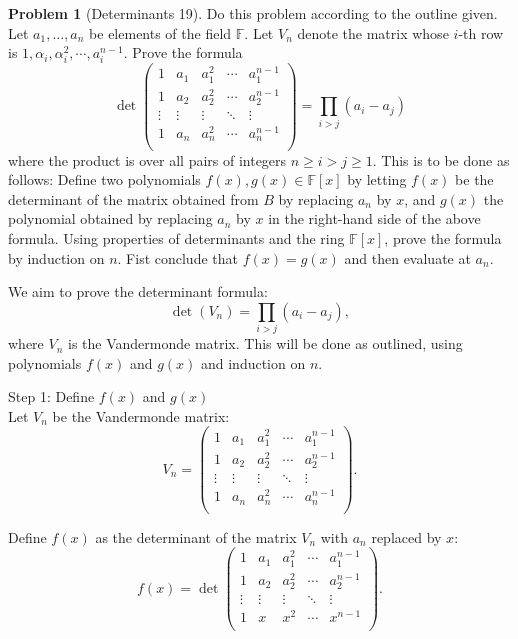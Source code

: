 \documentclass[12pt]{article}
\theoremstyle{definition}
\newtheorem{problem}{Problem}
\begin{document}
\begin{problem}[Determinants 19]
    Do this problem according to the outline given. Let $a_1, \ldots, a_n$ be elements of the field $\mathbb{F}$.
    Let $V_n$ denote the matrix whose $i$-th row is $1, \alpha_i, \alpha_i^2, \cdots, a_i^{n-1}$. Prove the formula
    \[  
        \det
        \begin{pmatrix}
            1 & a_1 & a_1^2 & \cdots & a_1^{n-1}\\
            1 & a_2 & a_2^2 & \cdots & a_2^{n-1}\\
            \vdots & \vdots & \vdots & \ddots & \vdots\\
            1 & a_n & a_n^2 & \cdots & a_n^{n-1}\\
        \end{pmatrix}
        = \prod_{i > j}(a_i - a_j)
    \]
    where the product is over all pairs of integers $n \geq i > j \geq 1$. This is to be done as follows:
    Define two polynomials $f(x), g(x) \in \mathbb{F}[x]$ by letting $f(x)$ be the determinant of the matrix
    obtained from $B$ by replacing $a_n$ by $x$, and $g(x)$ the polynomial obtained by replacing $a_n$ by $x$
    in the right-hand side of the above formula. Using properties of determinants and the ring $\mathbb{F}[x]$,
    prove the formula by induction on $n$. Fist conclude that $f(x) = g(x)$ and then evaluate at $a_n$.

    \begin{solution}
        We aim to prove the determinant formula:
        \[
        \det(V_n) = \prod_{i > j}(a_i - a_j),
        \]
        where \( V_n \) is the Vandermonde matrix. This will be done as outlined, using polynomials \( f(x) \) and \( g(x) \) and induction on \( n \).

        Step 1: Define \( f(x) \) and \( g(x) \)\\
        Let \( V_n \) be the Vandermonde matrix:
        \[
        V_n =
        \begin{pmatrix}
        1 & a_1 & a_1^2 & \cdots & a_1^{n-1} \\
        1 & a_2 & a_2^2 & \cdots & a_2^{n-1} \\
        \vdots & \vdots & \vdots & \ddots & \vdots \\
        1 & a_n & a_n^2 & \cdots & a_n^{n-1} \\
        \end{pmatrix}.
        \]

        Define \( f(x) \) as the determinant of the matrix \( V_n \) with \( a_n \) replaced by \( x \):
        \[
        f(x) = 
        \det
        \begin{pmatrix}
        1 & a_1 & a_1^2 & \cdots & a_1^{n-1} \\
        1 & a_2 & a_2^2 & \cdots & a_2^{n-1} \\
        \vdots & \vdots & \vdots & \ddots & \vdots \\
        1 & x & x^2 & \cdots & x^{n-1} \\
        \end{pmatrix}.
        \]


\end{solution}
\end{problem}
\end{document}
